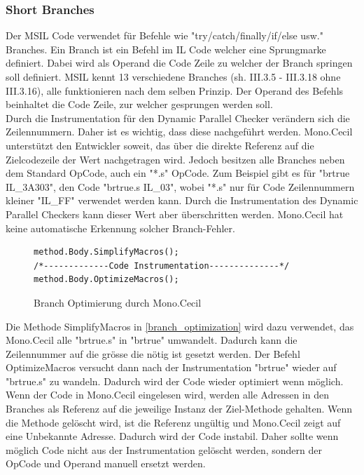 \documentclass[10pt,a4paper]{article}
\begin{document}
\subsubsection{Short Branches}
Der MSIL Code verwendet für Befehle wie "try/catch/finally/if/else usw." Branches. Ein Branch ist ein Befehl im IL Code welcher eine Sprungmarke definiert. Dabei wird als Operand die Code Zeile zu welcher der Branch springen soll definiert. MSIL kennt 13 verschiedene Branches (sh. \cite{ecma} III.3.5 - III.3.18 ohne III.3.16), alle funktionieren nach dem selben Prinzip. Der Operand des Befehls beinhaltet die Code Zeile, zur welcher gesprungen werden soll.\\
Durch die Instrumentation für den Dynamic Parallel Checker verändern sich die Zeilennummern. Daher ist es wichtig, dass diese nachgeführt werden. Mono.Cecil unterstützt den Entwickler soweit, das über die direkte Referenz auf die Zielcodezeile der Wert nachgetragen wird. Jedoch besitzen alle Branches neben dem Standard OpCode, auch ein "*.s" OpCode. Zum Beispiel gibt es für "brtrue IL\_3A303", den Code "brtrue.s IL\_03", wobei "*.s" nur für Code Zeilennummern kleiner "IL\_FF" verwendet werden kann. Durch die Instrumentation des Dynamic Parallel Checkers kann dieser Wert aber überschritten werden. Mono.Cecil hat keine automatische Erkennung solcher Branch-Fehler.
\begin{figure}[H]
\centering
\begin{lstlisting}[backgroundcolor=\color{backcolor}]
method.Body.SimplifyMacros();
/*-------------Code Instrumentation--------------*/
method.Body.OptimizeMacros();
\end{lstlisting}
\caption{Branch Optimierung durch Mono.Cecil}\label{branch_optimization}
\end{figure}
Die Methode SimplifyMacros in \autoref{branch_optimization} wird dazu verwendet, das Mono.Cecil alle "brtrue.s" in "brtrue" umwandelt. Dadurch kann die Zeilennummer auf die grösse die nötig ist gesetzt werden. Der Befehl OptimizeMacros versucht dann nach der Instrumentation "brtrue" wieder auf "brtrue.s" zu wandeln. Dadurch wird der Code wieder optimiert wenn möglich.\\
Wenn der Code in Mono.Cecil eingelesen wird, werden alle Adressen in den Branches als Referenz auf die jeweilige Instanz der Ziel-Methode gehalten. Wenn die Methode gelöscht wird, ist die Referenz ungültig und Mono.Cecil zeigt auf eine Unbekannte Adresse. Dadurch wird der Code instabil. Daher sollte wenn möglich Code nicht aus der Instrumentation gelöscht werden, sondern der OpCode und Operand manuell ersetzt werden.
\end{document}
